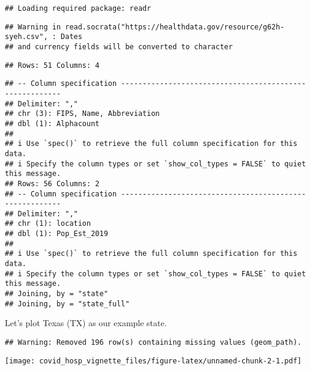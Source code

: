 \documentclass[
]{article}
\newenvironment{Shaded}{\begin{snugshade}}{\end{snugshade}}
\newcommand{\AttributeTok}[1]{\textcolor[rgb]{0.77,0.63,0.00}{#1}}
\newcommand{\FunctionTok}[1]{\textcolor[rgb]{0.00,0.00,0.00}{#1}}
\newcommand{\NormalTok}[1]{#1}
\newcommand{\SpecialCharTok}[1]{\textcolor[rgb]{0.00,0.00,0.00}{#1}}
\newcommand{\StringTok}[1]{\textcolor[rgb]{0.31,0.60,0.02}{#1}}
\begin{document}
\begin{verbatim}
## Loading required package: readr
\end{verbatim}

\begin{verbatim}
## Warning in read.socrata("https://healthdata.gov/resource/g62h-syeh.csv", : Dates
## and currency fields will be converted to character
\end{verbatim}

\begin{verbatim}
## Rows: 51 Columns: 4
\end{verbatim}

\begin{verbatim}
## -- Column specification --------------------------------------------------------
## Delimiter: ","
## chr (3): FIPS, Name, Abbreviation
## dbl (1): Alphacount
## 
## i Use `spec()` to retrieve the full column specification for this data.
## i Specify the column types or set `show_col_types = FALSE` to quiet this message.
## Rows: 56 Columns: 2
## -- Column specification --------------------------------------------------------
## Delimiter: ","
## chr (1): location
## dbl (1): Pop_Est_2019
## 
## i Use `spec()` to retrieve the full column specification for this data.
## i Specify the column types or set `show_col_types = FALSE` to quiet this message.
## Joining, by = "state"
## Joining, by = "state_full"
\end{verbatim}

Let's plot Texas (TX) as our example state.

\begin{Shaded}
\end{Shaded}

\begin{verbatim}
## Warning: Removed 196 row(s) containing missing values (geom_path).
\end{verbatim}

\texttt{[image: covid\_hosp\_vignette\_files/figure-latex/unnamed-chunk-2-1.pdf]}
\end{document}
